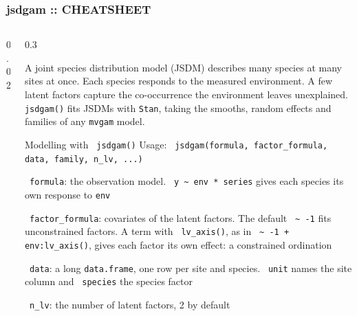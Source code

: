 \documentclass[final,9pt,fleqn]{beamer}\usepackage[]{graphicx}\usepackage[]{xcolor}
\begin{document}
\begin{frame}[fragile]
  \frametitle{{\fontsize{41}{43} \selectfont \textcolor{mygray}{jsdgam ::}} {\fontsize{25}{25} \textbf{\textcolor{mygray}{CHEATSHEET}}}}
\vspace{-0.6in}
  \begin{columns}
    \begin{column}{0.02\paperwidth} %
    \end{column}

    \begin{column}{0.3\paperwidth}

\begin{block}
\noindent\makebox[\linewidth]{\rule{0.3\paperwidth}{0.2pt}}

A joint species distribution model (JSDM) describes many species at many sites at once. Each species responds to the measured environment. A few latent factors capture the co-occurrence the environment leaves unexplained. \texttt{jsdgam()} fits JSDMs with \texttt{Stan}, taking the smooths, random effects and families of any \texttt{mvgam} model.

\end{block}

\begin{block}{{\fontsize{21}{21} \selectfont \color{BrickRed} Modelling with \texttt{\color{Orchid} jsdgam()}}}
Usage: \texttt{\color{Orchid} jsdgam(formula, factor\_formula, data, family, n\_lv, ...)}

\medskip
\texttt{\color{Orchid} formula}: the observation model. \texttt{\color{Orchid} y \textasciitilde{} env * series} gives each species its own response to \texttt{env}

\medskip
\texttt{\color{Orchid} factor\_formula}: covariates of the latent factors. The default \texttt{\color{Orchid} \textasciitilde{} -1} fits unconstrained factors. A term with \texttt{\color{Orchid} lv\_axis()}, as in \texttt{\color{Orchid} \textasciitilde{} -1 + env:lv\_axis()}, gives each factor its own effect: a constrained ordination

\medskip
\texttt{\color{Orchid} data}: a long \texttt{data.frame}, one row per site and species. \texttt{\color{Orchid} unit} names the site column and \texttt{\color{Orchid} species} the species factor

\medskip
\texttt{\color{Orchid} n\_lv}: the number of latent factors, 2 by default


\end{block}
\end{column}
\end{columns}
\end{frame}
\end{document}
